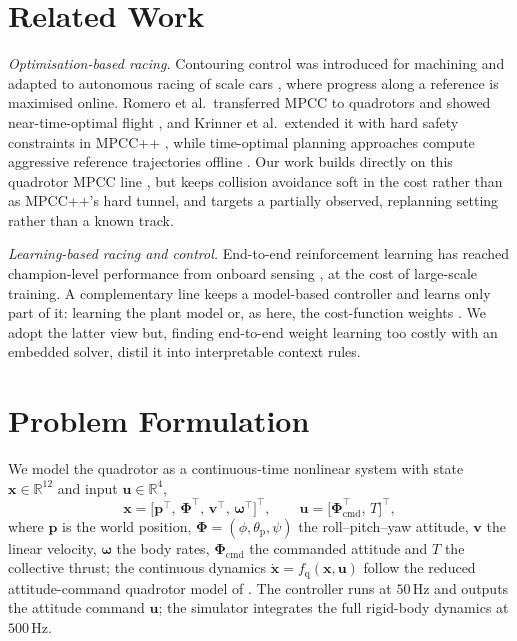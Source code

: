 \documentclass[conference]{IEEEtran}
\begin{document}
\section{Related Work}
\emph{Optimisation-based racing.} Contouring control was introduced for machining
\cite{lam2010mpcc} and adapted to autonomous racing of scale cars
\cite{liniger2015racing}, where progress along a reference is maximised online.
Romero et al.\ transferred MPCC to quadrotors and showed near-time-optimal flight
\cite{romero2022mpcc}, and Krinner et al.\ extended it with hard safety constraints in MPCC++ \cite{krinner2024mpccpp}, while time-optimal planning approaches compute
aggressive reference trajectories offline \cite{foehn2021timeoptimal,penicka2022}.
Our work builds directly on this quadrotor MPCC line
\cite{romero2022mpcc,krinner2024mpccpp}, but keeps collision avoidance soft in the
cost rather than as MPCC++'s hard tunnel, and targets a partially observed, replanning setting rather than a known
track.

\emph{Learning-based racing and control.} End-to-end reinforcement learning has
reached champion-level performance from onboard sensing
\cite{kaufmann2023champion,song2021rl}, at the cost of large-scale training.
A complementary line keeps a model-based controller and learns only part of it:
learning the plant model \cite{kabzan2019lmpc} or, as here, the cost-function
weights \cite{zarrouki2021wmpc,zanon2021rlmpc,mehndiratta2018}. We adopt the
latter view but, finding end-to-end weight learning too costly with an embedded
solver, distil it into interpretable context rules.

\section{Problem Formulation}
We model the quadrotor as a continuous-time nonlinear system with state
$\mathbf{x}\in\mathbb{R}^{12}$ and input $\mathbf{u}\in\mathbb{R}^{4}$,
\begin{equation}
  \mathbf{x} = \big[\mathbf{p}^\top,\,\boldsymbol{\Phi}^\top,\,
  \mathbf{v}^\top,\,\boldsymbol{\omega}^\top\big]^\top,\qquad
  \mathbf{u} = \big[\boldsymbol{\Phi}_{\mathrm{cmd}}^\top,\,T\big]^\top,
  \label{eq:state}
\end{equation}
where $\mathbf{p}$ is the world position, $\boldsymbol{\Phi}=(\phi,\theta_\mathrm{p},\psi)$
the roll--pitch--yaw attitude, $\mathbf{v}$ the linear velocity,
$\boldsymbol{\omega}$ the body rates, $\boldsymbol{\Phi}_{\mathrm{cmd}}$ the
commanded attitude and $T$ the collective thrust; the continuous dynamics
$\dot{\mathbf{x}}=f_{\mathrm{q}}(\mathbf{x},\mathbf{u})$ follow the reduced
attitude-command quadrotor model of \cite{mellinger2011minsnap}. The controller
runs at $50\,\mathrm{Hz}$ and outputs the attitude command $\mathbf{u}$; the
simulator integrates the full rigid-body dynamics at $500\,\mathrm{Hz}$.
\end{document}
